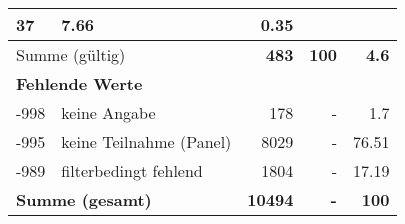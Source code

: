 \begin{longtable}{lXrrr}
       \num{37} &
       \num[round-mode=places,round-precision=2]{7.66} &
         \num[round-mode=places,round-precision=2]{0.35} \\
     \midrule
     \multicolumn{2}{l}{Summe (gültig)} &
       \textbf{\num{483}} &
     \textbf{\num{100}} &
       \textbf{\num[round-mode=places,round-precision=2]{4.6}} \\
     \multicolumn{5}{l}{\textbf{Fehlende Werte}}\\
       -998 &
       keine Angabe &
         \num{178} &
        - &
         \num[round-mode=places,round-precision=2]{1.7} \\
       -995 &
       keine Teilnahme (Panel) &
         \num{8029} &
        - &
         \num[round-mode=places,round-precision=2]{76.51} \\
       -989 &
       filterbedingt fehlend &
         \num{1804} &
        - &
         \num[round-mode=places,round-precision=2]{17.19} \\
     \midrule
     \multicolumn{2}{l}{\textbf{Summe (gesamt)}} &
          \textbf{\num{10494}} &
        \textbf{-} &
        \textbf{\num{100}} \\
     \bottomrule
     \end{longtable}
     
